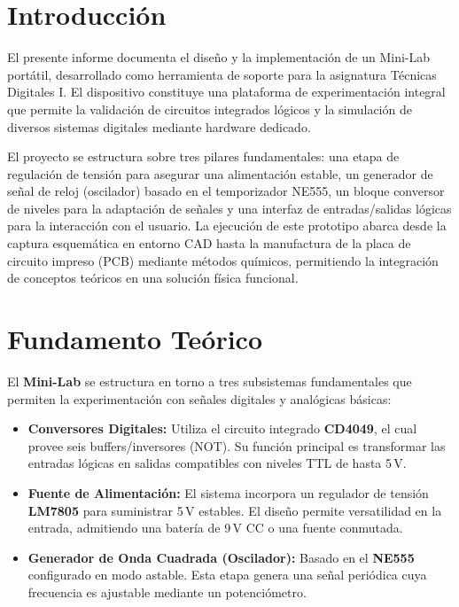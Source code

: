 \documentclass[a4paper,12pt]{article}
\begin{document}
	
	\section*{Introducción}
	
	El presente informe documenta el diseño y la implementación de un Mini-Lab portátil, desarrollado como herramienta de soporte para la asignatura Técnicas Digitales I. El dispositivo constituye una plataforma de experimentación integral que permite la validación de circuitos integrados lógicos y la simulación de diversos sistemas digitales mediante hardware dedicado.
	
	El proyecto se estructura sobre tres pilares fundamentales: una etapa de regulación de tensión para asegurar una alimentación estable, un generador de señal de reloj (oscilador) basado en el temporizador NE555, un bloque conversor de niveles para la adaptación de señales y una interfaz de entradas/salidas lógicas para la interacción con el usuario. La ejecución de este prototipo abarca desde la captura esquemática en entorno CAD hasta la manufactura de la placa de circuito impreso (PCB) mediante métodos químicos, permitiendo la integración de conceptos teóricos en una solución física funcional.
	\newpage
	
	
	\section*{Fundamento Teórico}
	El \textbf{Mini-Lab} se estructura en torno a tres subsistemas fundamentales que permiten la experimentación con señales digitales y analógicas básicas:
	
	\begin{itemize}
		\item \textbf{Conversores Digitales:} Utiliza el circuito integrado \textbf{CD4049}, el cual provee seis buffers/inversores (NOT). Su función principal es transformar las entradas lógicas en salidas compatibles con niveles TTL de hasta 5\,V.
		\item \textbf{Fuente de Alimentación:} El sistema incorpora un regulador de tensión \textbf{LM7805} para suministrar 5\,V estables. El diseño permite versatilidad en la entrada, admitiendo una batería de 9\,V CC o una fuente conmutada.
		\item \textbf{Generador de Onda Cuadrada (Oscilador):} Basado en el \textbf{NE555} configurado en modo astable. Esta etapa genera una señal periódica cuya frecuencia es ajustable mediante un potenciómetro.
	\end{itemize}
	
\end{document}
